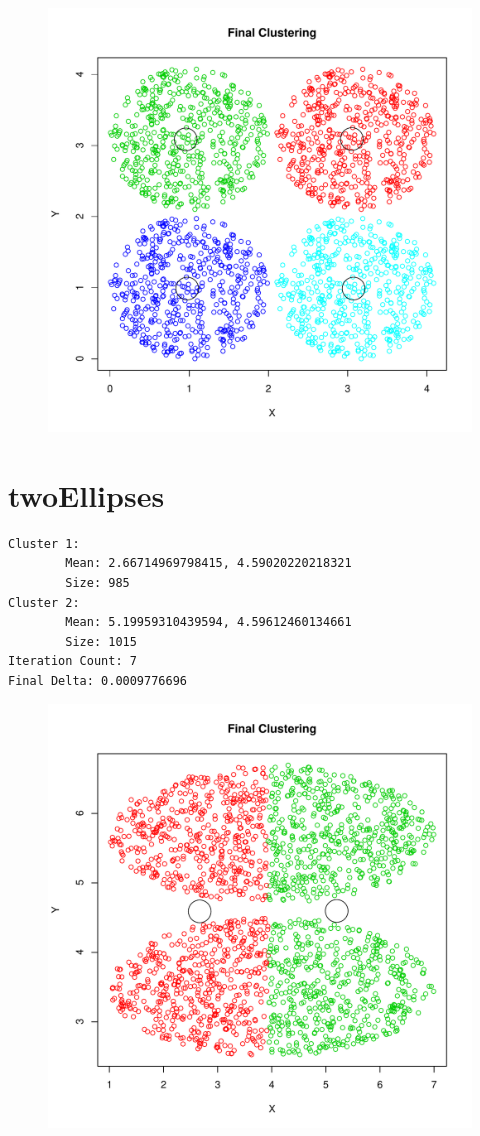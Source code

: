 \documentclass{report}
\begin{document}
\begin{figure}[htp!]
  \centering
  \includegraphics[width=0.9\linewidth]{fourCircles}
\end{figure}

\pagebreak

\section*{twoEllipses}

\begin{verbatim}
Cluster 1:
        Mean: 2.66714969798415, 4.59020220218321 
        Size: 985 
Cluster 2:
        Mean: 5.19959310439594, 4.59612460134661 
        Size: 1015 
Iteration Count: 7 
Final Delta: 0.0009776696 
\end{verbatim}

\begin{figure}[htp!]
  \centering
  \includegraphics[width=0.9\linewidth]{twoEllipses}
\end{figure}
\end{document}
